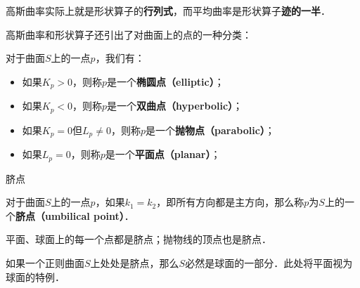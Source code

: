 高斯曲率实际上就是形状算子的\textbf{行列式}，而平均曲率是形状算子\textbf{迹的一半}．

高斯曲率和形状算子还引出了对曲面上的点的一种分类：

\begin{definition}{}
对于曲面$S$上的一点$p$，我们有：
\begin{itemize}
\item 如果$K_p>0$，则称$p$是一个\textbf{椭圆点（elliptic）}；
\item 如果$K_p<0$，则称$p$是一个\textbf{双曲点（hyperbolic）}；
\item 如果$K_p=0$但$L_p\not=0$，则称$p$是一个\textbf{抛物点（parabolic）}；
\item 如果$L_p=0$，则称$p$是一个\textbf{平面点（planar）}；
\end{itemize}
\end{definition}


\begin{definition}{脐点}

对于曲面$S$上的一点$p$，如果$k_1=k_2$，即所有方向都是主方向，那么称$p$为$S$上的一个\textbf{脐点（umbilical point）}．

\end{definition}

平面、球面上的每一个点都是脐点；抛物线的顶点也是脐点．

\begin{theorem}{}
如果一个正则曲面$S$上处处是脐点，那么$S$必然是球面的一部分．此处将平面视为球面的特例．
\end{theorem}




